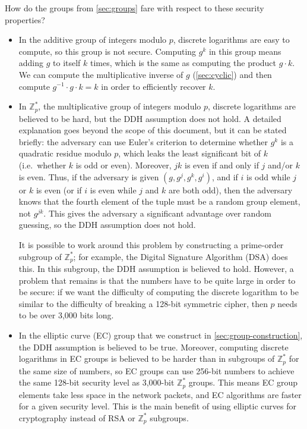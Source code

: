 \documentclass{article}
\begin{document}
How do the groups from \autoref{sec:groups} fare with respect to these security properties?
\begin{itemize}
\item In the additive group of integers modulo $p$, discrete logarithms are easy to compute, so this group is not secure.
    Computing $g^k$ in this group means adding $g$ to itself $k$ times, which is the same as computing the product $g \cdot k$.
    We can compute the multiplicative inverse of $g$ (\autoref{sec:cyclic}) and then compute $g^{-1} \cdot g \cdot k = k$ in order to efficiently recover $k$.

\item In $\mathbb{Z}_p^*$, the multiplicative group of integers modulo $p$, discrete logarithms are believed to be hard, but the DDH assumption does not hold.
    A detailed explanation goes beyond the scope of this document, but it can be stated briefly: the adversary can use Euler's criterion to determine whether $g^k$ is a quadratic residue modulo $p$, which leaks the least significant bit of $k$ (i.e.\ whether $k$ is odd or even).
    Moreover, $jk$ is even if and only if $j$ and/or $k$ is even.
    Thus, if the adversary is given $(g, g^j, g^k, g^i)$, and if $i$ is odd while $j$ or $k$ is even (or if $i$ is even while $j$ and $k$ are both odd), then the adversary knows that the fourth element of the tuple must be a random group element, not $g^{jk}$.
    This gives the adversary a significant advantage over random guessing, so the DDH assumption does not hold.

    It is possible to work around this problem by constructing a prime-order subgroup of $\mathbb{Z}_p^*$; for example, the Digital Signature Algorithm (DSA) does this.
    In this subgroup, the DDH assumption is believed to hold.
    However, a problem that remains is that the numbers have to be quite large in order to be secure: if we want the difficulty of computing the discrete logarithm to be similar to the difficulty of breaking a 128-bit symmetric cipher, then $p$ needs to be over 3,000 bits long.

\item In the elliptic curve (EC) group that we construct in \autoref{sec:group-construction}, the DDH assumption is believed to be true.
    Moreover, computing discrete logarithms in EC groups is believed to be harder than in subgroups of $\mathbb{Z}_p^*$ for the same size of numbers, so EC groups can use 256-bit numbers to achieve the same 128-bit security level as 3,000-bit $\mathbb{Z}_p^*$ groups.
    This means EC group elements take less space in the network packets, and EC algorithms are faster for a given security level.
    This is the main benefit of using elliptic curves for cryptography instead of RSA or $\mathbb{Z}_p^*$ subgroups.
\end{itemize}
\end{document}
